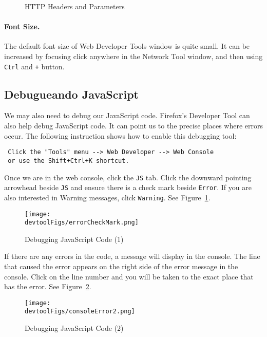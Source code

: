 \begin{figure}[htb]
 \centering
 \caption{HTTP Headers and Parameters}
\end{figure}


\paragraph{Font Size.} The default font size of Web Developer Tools window is quite small. It
can be increased by focusing click anywhere in the Network Tool window, and then using
\texttt{Ctrl} and \texttt{+} button.


\subsection{Debugueando JavaScript}
\label{web:sec:jsdebugging}

We may also need to debug our JavaScript code. Firefox's Developer Tool can also help debug
JavaScript code. It can point us to the precise places where errors occur. The following
instruction shows how to enable this debugging tool:

\begin{lstlisting}
 Click the "Tools" menu --> Web Developer --> Web Console
 or use the Shift+Ctrl+K shortcut.
\end{lstlisting}


Once we are in the web console, click the {\tt JS} tab. Click the downward pointing arrowhead
beside {\tt JS} and ensure there is a check mark beside {\tt Error}. If you are also interested
in Warning messages, click {\tt Warning}. See Figure~\ref{devtool:fig:errocheckmark}.


\begin{figure}[htb]
\begin{center}
  \texttt{[image: \\devtoolFigs/errorCheckMark.png]}
\end{center}
\caption{Debugging JavaScript Code (1)}
\label{devtool:fig:errocheckmark}
\end{figure}
 

If there are any errors in the code, a message will display in the console. The line that
caused the error appears on the right side of the error message in the console. Click on the
line number and you will be taken to the exact place that has the error.
See Figure~\ref{devtool:fig:console}.


\begin{figure}[htb]
\begin{center}
  \texttt{[image: \\devtoolFigs/consoleError2.png]}
\end{center}
\caption{Debugging JavaScript Code (2)}
\label{devtool:fig:console}
\end{figure}
 




 
